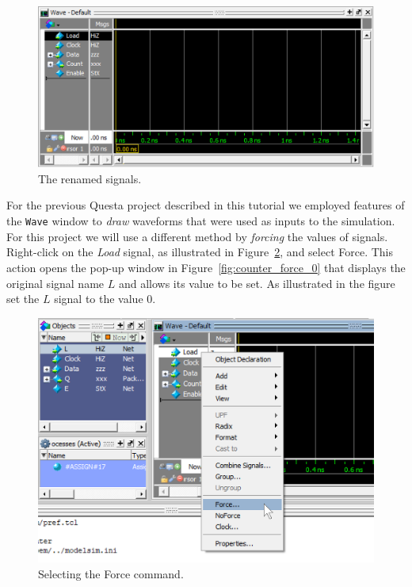 \documentclass[11pt, twoside, pdftex]{article}
\begin{document}
\begin{figure}[H]
   \begin{center}
      \includegraphics[scale=.75]{figures/counter_names.png}
   \caption{The renamed signals.} 
	 \label{fig:counter_names}
	 \end{center}
\end{figure}

For the previous Questa project described in this tutorial we employed features of the 
\texttt{Wave} window to {\it draw} waveforms that were used as inputs to the simulation. For 
this project we will use a different method by {\it forcing} the values of signals. Right-click
on the {\it Load} signal, as illustrated in Figure~\ref{fig:counter_force}, and select 
{\sf Force}. This action opens the pop-up window in Figure~\ref{fig:counter_force_0} that 
displays the original signal name $L$ and allows its value to be set. As illustrated in
the figure set the $L$ signal to the value 0.

\begin{figure}[H]
   \begin{center}
      \includegraphics[scale=.75]{figures/counter_force.png}
       \caption{Selecting the {\sf Force} command.} 
	 \label{fig:counter_force}
	 \end{center}
\end{figure}
\end{document}

